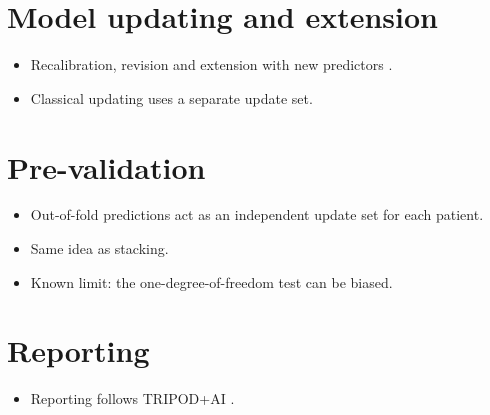 \section{Model updating and extension}
\begin{itemize}
    \item Recalibration, revision and extension with new predictors \cite{janssen_updating_2008}. 
    \item Classical updating uses a separate update set.
\end{itemize}

\section{Pre-validation}
\begin{itemize}
    \item Out-of-fold predictions act as an independent update set for each patient. 
    \item Same idea as stacking. 
    \item Known limit: the one-degree-of-freedom test can be biased. 
\end{itemize}

\section{Reporting}
\begin{itemize}
    \item Reporting follows TRIPOD+AI \cite{collins_tripodai_2024}.
\end{itemize}
